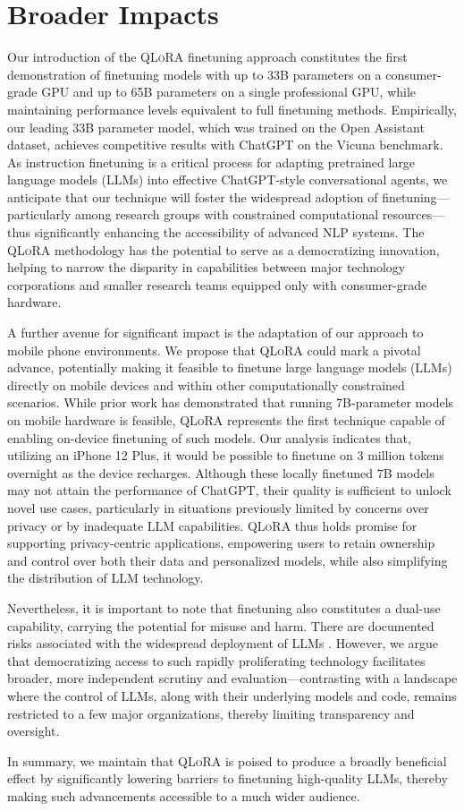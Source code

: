 \section{Broader Impacts}

Our introduction of the \textsc{QLoRA} finetuning approach constitutes the first demonstration of finetuning models with up to 33B parameters on a consumer-grade GPU and up to 65B parameters on a single professional GPU, while maintaining performance levels equivalent to full finetuning methods. Empirically, our leading 33B parameter model, which was trained on the Open Assistant dataset, achieves competitive results with ChatGPT on the Vicuna benchmark. As instruction finetuning is a critical process for adapting pretrained large language models (LLMs) into effective ChatGPT-style conversational agents, we anticipate that our technique will foster the widespread adoption of finetuning—particularly among research groups with constrained computational resources—thus significantly enhancing the accessibility of advanced NLP systems. The \textsc{QLoRA} methodology has the potential to serve as a democratizing innovation, helping to narrow the disparity in capabilities between major technology corporations and smaller research teams equipped only with consumer-grade hardware.

A further avenue for significant impact is the adaptation of our approach to mobile phone environments. We propose that \textsc{QLoRA} could mark a pivotal advance, potentially making it feasible to finetune large language models (LLMs) directly on mobile devices and within other computationally constrained scenarios. While prior work has demonstrated that running 7B-parameter models on mobile hardware is feasible, \textsc{QLoRA} represents the first technique capable of enabling on-device finetuning of such models. Our analysis indicates that, utilizing an iPhone 12 Plus, it would be possible to finetune on 3 million tokens overnight as the device recharges. Although these locally finetuned 7B models may not attain the performance of ChatGPT, their quality is sufficient to unlock novel use cases, particularly in situations previously limited by concerns over privacy or by inadequate LLM capabilities. \textsc{QLoRA} thus holds promise for supporting privacy-centric applications, empowering users to retain ownership and control over both their data and personalized models, while also simplifying the distribution of LLM technology.

Nevertheless, it is important to note that finetuning also constitutes a dual-use capability, carrying the potential for misuse and harm. There are documented risks associated with the widespread deployment of LLMs \citep{bommasani2021opportunities,bender2021dangers}. However, we argue that democratizing access to such rapidly proliferating technology facilitates broader, more independent scrutiny and evaluation—contrasting with a landscape where the control of LLMs, along with their underlying models and code, remains restricted to a few major organizations, thereby limiting transparency and oversight.

In summary, we maintain that \textsc{QLoRA} is poised to produce a broadly beneficial effect by significantly lowering barriers to finetuning high-quality LLMs, thereby making such advancements accessible to a much wider audience.